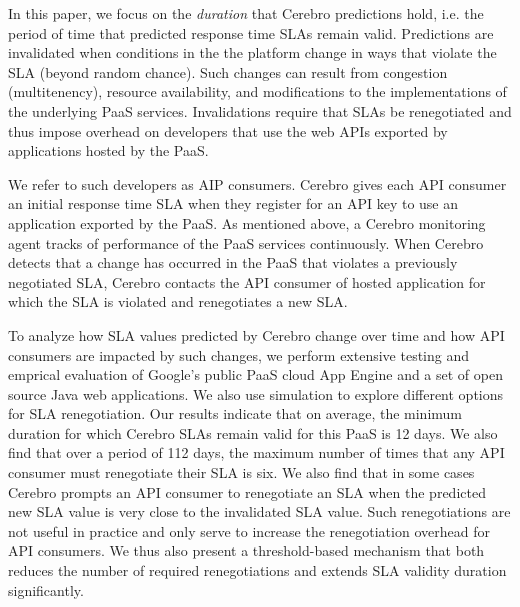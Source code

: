 In this paper, we focus on the \textit{duration} that Cerebro predictions hold, i.e. the period
of time that predicted response time SLAs remain valid.  Predictions are invalidated
when conditions in the the platform change in ways that violate the SLA (beyond random
chance).  Such changes can result from congestion (multitenency), resource availability, 
and modifications to the implementations of the underlying PaaS services. Invalidations 
require that SLAs be renegotiated and thus impose overhead on developers that use the 
web APIs exported by applications hosted by the PaaS.

We refer to such developers as AIP consumers.  Cerebro gives each API consumer an initial 
response time SLA when they register for an API key to use an application exported by the PaaS.
As mentioned above, a Cerebro monitoring agent tracks of performance of the PaaS services 
continuously.  When Cerebro detects that a change has occurred in the PaaS that
violates a previously negotiated SLA, Cerebro contacts the API consumer of hosted application
for which the SLA is violated and renegotiates a new SLA.

To analyze how SLA values predicted by Cerebro change over time and how API consumers are 
impacted by such changes, we perform extensive testing and emprical evaluation
of Google's public PaaS cloud App Engine and a set of open source Java web applications.  
We also use simulation to explore different options for SLA renegotiation.
Our results indicate that on average, the minimum duration for which Cerebro SLAs 
remain valid for this PaaS is 12 days.  We also find that
over a period of 112 days, the maximum number of times that any API consumer must renegotiate
their SLA is six.  We also find that in some cases Cerebro prompts an API consumer to
renegotiate an SLA when the predicted new SLA value is very close to the invalidated SLA value. 
Such renegotiations are not useful in practice and only serve to increase the renegotiation overhead
for API consumers. We thus also present a threshold-based mechanism that both reduces 
the number of required renegotiations and extends SLA validity duration significantly.

